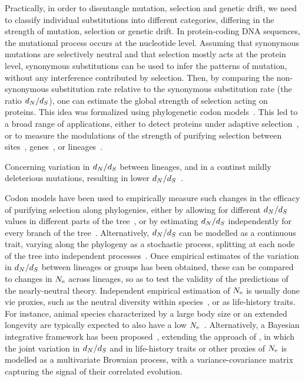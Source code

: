 \documentclass{MBE}
\begin{document}
	Practically, in order to disentangle mutation, selection and {genetic drift}, we need to classify individual substitutions into different categories, differing in the strength of mutation, selection or {genetic drift}.
	In protein-coding {DNA} sequences, the mutational process occurs at the nucleotide level.
	Assuming that {synonymous} mutations are selectively {neutral} and that selection mostly acts at the protein level, {synonymous} substitutions can be used to infer the patterns of mutation, without any interference contributed by selection.
	Then, by comparing the {non-synonymous} {substitution} rate relative to the {synonymous} {substitution} rate (the ratio $d_N / d_S$), one can estimate the global strength of selection acting on proteins.
	This idea was formalized using phylogenetic {codon} models~\citep{Muse1994,Goldman1994}.
	This led to a broad range of applications, either to detect proteins under adaptive selection~\citep{Kosiol2008}, or to measure the modulations of the strength of purifying selection between sites~\citep{Echave2016}, genes~\citep{Zhang2015}, or lineages~\citep{Lartillot2011}.

	Concerning variation in $d_N / d_S$ between lineages, and in a continst mildly deleterious mutations, resulting in lower $d_N / d_S$~\citep{Kimura1979, Welch2008}.

	Codon models have been used to empirically measure such changes in the efficacy of purifying selection along phylogenies, either by allowing for different $d_N / d_S$ values in different parts of the tree~\citep{Dutheil2012}, or by estimating $d_N / d_S$ independently for every branch of the tree~\citep{Popadin2007}.
	Alternatively, $d_N / d_S$ can be modelled as a continuous trait, varying along the phylogeny as a stochastic process, splitting at each node of the tree into independent processes~\citep{Seo2004}.
	Once empirical estimates of the variation in $d_N / d_S$ between lineages or groups has been obtained, these can be compared to changes in $N_{\text{e}}$ across lineages, so as to test the validity of the predictions of the {nearly-neutral} theory.
	Independent empirical estimation of $N_{\text{e}}$ is usually done vie proxies, such as the {neutral} diversity within species~\citep{Galtier2016}, or as life-history traits.
	For instance, animal species characterized by a large body size or an extended longevity are typically expected to also have a low $N_{\text{e}}$~\citep{Romiguier2014}.
	Alternatively, a Bayesian integrative framework has been proposed~\citep{Lartillot2011}, extending the approach of \citet{Seo2004}, in which the joint variation in $d_N / d_S$ and in life-history traits or other proxies of $N_{\text{e}}$ is modelled as a multivariate Brownian process, with a variance-covariance matrix capturing the signal of their correlated evolution.
\end{document}
